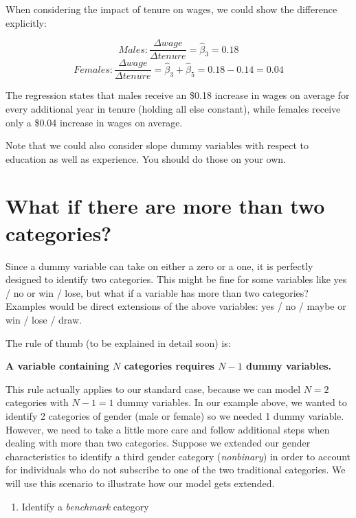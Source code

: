 \documentclass[
]{book}
\providecommand{\tightlist}{%
  \setlength{\itemsep}{0pt}\setlength{\parskip}{0pt}}
\begin{document}
When considering the impact of tenure on wages, we could show the difference explicitly:

\[Males: \frac{\Delta wage}{\Delta tenure} = \hat{\beta}_3=0.18\]
\[Females: \frac{\Delta wage}{\Delta tenure} = \hat{\beta}_3+\hat{\beta}_5=0.18-0.14=0.04\]

The regression states that males receive an \$0.18 increase in wages on average for every additional year in tenure (holding all else constant), while females receive only a \$0.04 increase in wages on average.

Note that we could also consider slope dummy variables with respect to education as well as experience. You should do those on your own.

\hypertarget{what-if-there-are-more-than-two-categories}{%
\section{What if there are more than two categories?}\label{what-if-there-are-more-than-two-categories}}

Since a dummy variable can take on either a zero or a one, it is perfectly designed to identify two categories. This might be fine for some variables like yes / no or win / lose, but what if a variable has more than two categories? Examples would be direct extensions of the above variables: yes / no / maybe or win / lose / draw.

The rule of thumb (to be explained in detail soon) is:

\textbf{A variable containing \(N\) categories requires \(N-1\) dummy variables.}

This rule actually applies to our standard case, because we can model \(N=2\) categories with \(N-1=1\) dummy variables. In our example above, we wanted to identify 2 categories of gender (male or female) so we needed 1 dummy variable. However, we need to take a little more care and follow additional steps when dealing with more than two categories. Suppose we extended our gender characteristics to identify a third gender category (\emph{nonbinary}) in order to account for individuals who do not subscribe to one of the two traditional categories. We will use this scenario to illustrate how our model gets extended.

\begin{enumerate}
\def\labelenumi{\arabic{enumi}.}
\tightlist
\item
  Identify a \emph{benchmark} category
\end{enumerate}
\end{document}
